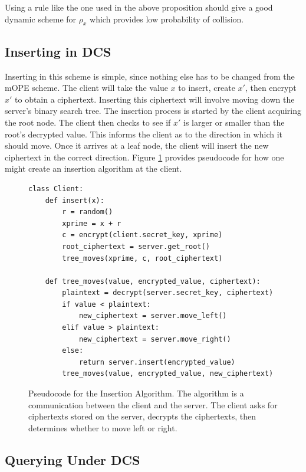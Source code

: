 \documentclass[12pt]{article}
\begin{document}
Using a rule like the one used in the above proposition should give a good dynamic scheme for $\rho_x$ which provides low probability of collision.

\subsection{Inserting in DCS}

Inserting in this scheme is simple, since nothing else has to be changed from the mOPE scheme. The client will take the value $x$ to insert, create $x'$, then encrypt $x'$ to obtain a ciphertext. Inserting this ciphertext will involve moving down the server's binary search tree. The insertion process is started by the client acquiring the root node. The client then checks to see if $x'$ is larger or smaller than the root's decrypted value. This informs the client as to the direction in which it should move. Once it arrives at a leaf node, the client will insert the new ciphertext in the correct direction. Figure \ref{insertion_figure} provides pseudocode for how one might create an insertion algorithm at the client.

\begin{figure}[htb]
\lstset{language=Python}
\begin{lstlisting}[frame=single]
class Client:
    def insert(x):
        r = random()
        xprime = x + r
        c = encrypt(client.secret_key, xprime)
        root_ciphertext = server.get_root()
        tree_moves(xprime, c, root_ciphertext)

    def tree_moves(value, encrypted_value, ciphertext):
        plaintext = decrypt(server.secret_key, ciphertext)
        if value < plaintext:
            new_ciphertext = server.move_left()
        elif value > plaintext:
            new_ciphertext = server.move_right()
        else:
            return server.insert(encrypted_value)
        tree_moves(value, encrypted_value, new_ciphertext)
\end{lstlisting}
\caption{Pseudocode for the Insertion Algorithm. The algorithm is a communication between the client and the server. The client asks for ciphertexts stored on the server, decrypts the ciphertexts, then determines whether to move left or right.}
\label{insertion_figure}
\end{figure}


\subsection{Querying Under DCS}
\end{document}
